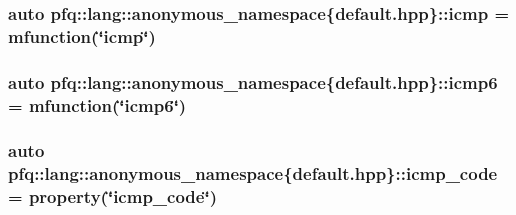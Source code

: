 \hypertarget{namespacepfq_1_1lang_1_1anonymous__namespace_02default_8hpp_03_a3becf93771a800904f002e39b1cc388f}{
\subsubsection[{icmp}]{\setlength{\rightskip}{0pt plus 5cm}auto pfq\+::lang\+::anonymous\+\_\+namespace\{default.\+hpp\}\+::icmp = {\bf mfunction}(\char`\"{}icmp\char`\"{})}}\label{namespacepfq_1_1lang_1_1anonymous__namespace_02default_8hpp_03_a3becf93771a800904f002e39b1cc388f}
\hypertarget{namespacepfq_1_1lang_1_1anonymous__namespace_02default_8hpp_03_a8fda9498af823eec4f9f8d81d4a171d5}{
\subsubsection[{icmp6}]{\setlength{\rightskip}{0pt plus 5cm}auto pfq\+::lang\+::anonymous\+\_\+namespace\{default.\+hpp\}\+::icmp6 = {\bf mfunction}(\char`\"{}icmp6\char`\"{})}}\label{namespacepfq_1_1lang_1_1anonymous__namespace_02default_8hpp_03_a8fda9498af823eec4f9f8d81d4a171d5}
\hypertarget{namespacepfq_1_1lang_1_1anonymous__namespace_02default_8hpp_03_a026262dd85de1db88a8303ed0f3dac18}{
\subsubsection[{icmp\+\_\+code}]{\setlength{\rightskip}{0pt plus 5cm}auto pfq\+::lang\+::anonymous\+\_\+namespace\{default.\+hpp\}\+::icmp\+\_\+code = {\bf property}(\char`\"{}icmp\+\_\+code\char`\"{})}}\label{namespacepfq_1_1lang_1_1anonymous__namespace_02default_8hpp_03_a026262dd85de1db88a8303ed0f3dac18}
